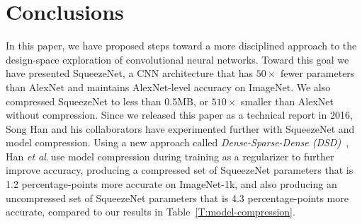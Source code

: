 \documentclass{article} %
\newcommand{\etal}{\textit{et al}.$~$}
\renewcommand{\cite}{\citep}
\def\vsp{\vspace{-0.15in}}
\begin{document}
%
%


\section{Conclusions}
\label{sec:conclusions}
\vsp

In this paper, we have proposed steps toward a more disciplined approach to the design-space exploration of convolutional neural networks. 
Toward this goal we have presented SqueezeNet, a CNN architecture that has $50\times$ fewer parameters than AlexNet and maintains AlexNet-level accuracy on ImageNet.
We also compressed SqueezeNet to less than 0.5MB, or $510\times$ smaller than AlexNet without compression. 
Since we released this paper as a technical report in 2016, Song Han and his collaborators have experimented further with SqueezeNet and model compression.
Using a new approach called {\em Dense-Sparse-Dense (DSD)}~\cite{DSD}, Han \etal use model compression during training as a regularizer to further improve accuracy, producing a compressed set of SqueezeNet parameters that is 1.2 percentage-points more accurate on ImageNet-1k, and also producing an uncompressed set of SqueezeNet parameters that is 4.3 percentage-points more accurate, compared to our results in Table~\ref{T:model-compression}.
\end{document}
